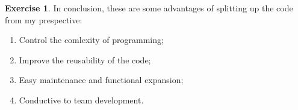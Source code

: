 \documentclass[11pt,a4paper,leqno]{article}
\theoremstyle{definition}
\newtheorem{exercise}{Exercise}
\begin{document}
\begin{exercise}
    In conclusion, these are some advantages of splitting up the code from my prespective:
    \begin{enumerate}
        \item Control the comlexity of programming;
        \item Improve the reusability of the code;
        \item Easy maintenance and functional expansion;
        \item Conductive to team development.
    \end{enumerate}
\end{exercise}


\end{document}
